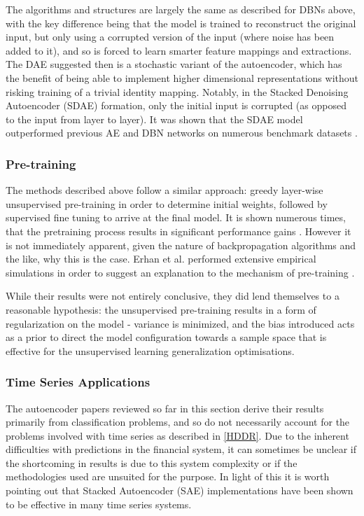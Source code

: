 \documentclass[a4paper,11pt,oneside]{article}
\theoremstyle{plain}
\theoremstyle{definition}
\begin{document}
The algorithms and structures are largely the same as described for DBNs above, with the key difference 
being that the model is trained to reconstruct the original input, but only using a corrupted version of the input 
(where noise has been added to it), and so is forced to learn smarter feature mappings and extractions. 
The DAE suggested then is a stochastic variant of the autoencoder, which has the benefit of being able to 
implement higher dimensional representations without risking training of a trivial identity mapping. Notably, 
in the Stacked Denoising Autoencoder (SDAE) formation, only the initial input is corrupted (as opposed to the 
input from layer to layer). It was shown that the SDAE model outperformed previous AE and DBN networks on 
numerous benchmark datasets \cite{Vincent} . 

\subsubsection {Pre-training}

The methods described above follow a similar approach: greedy layer-wise unsupervised pre-training in order to 
determine initial weights, followed by supervised fine tuning to arrive at the final model. It is shown numerous times, 
that the pretraining process results in significant performance gains \cite{Vincent}. However it is not immediately apparent, 
given the nature of backpropagation algorithms and the like, why this is the case. Erhan et al. performed 
extensive empirical simulations in order to suggest an explanation to the mechanism of pre-training \cite{Erhan}.
 \hfill \break 

While their results were not entirely conclusive, they did lend themselves to a reasonable hypothesis: 
the unsupervised pre-training results in a form of regularization on the model - variance is minimized, and the 
bias introduced acts as a prior to direct the model configuration towards a sample space that is effective for the unsupervised 
learning generalization optimisations.

\subsubsection {Time Series Applications}

The autoencoder papers reviewed so far in this section derive their results primarily from classification problems, 
and so do not necessarily account for the problems involved with time series as described in \ref{HDDR}. Due to 
the inherent difficulties with predictions in the financial system, it can sometimes be unclear if the shortcoming in 
results is due to this system complexity or if the methodologies used are unsuited for the purpose. In light of this 
it is worth pointing out that Stacked Autoencoder (SAE) implementations have been shown to be effective in many
 time series systems.  
 \hfill \break 
\end{document}
